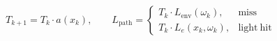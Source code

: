 \documentclass[border=6pt]{standalone}
\begin{document}
\color{white}
\(\displaystyle
T_{k+1} = T_k \cdot a(x_k),
\qquad
L_{\mathrm{path}} =
\begin{cases}
T_k \cdot L_{\mathrm{env}}(\omega_k), & \mathrm{miss}\\
T_k \cdot L_e(x_k,\omega_k), & \mathrm{light\ hit}
\end{cases}
\)
\end{document}
